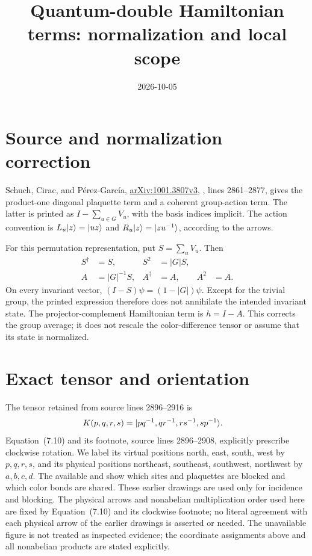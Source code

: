 \documentclass{article}
\title{Quantum-double Hamiltonian terms: normalization and local scope}
\author{}
\date{2026-10-05}
\begin{document}
\maketitle
{}

\section{Source and normalization correction}
Schuch, Cirac, and P\'erez-Garc\'ia,
\href{https://arxiv.org/abs/1001.3807}{arXiv:1001.3807v3},
, lines 2861--2877, gives the
product-one diagonal plaquette term and a coherent group-action term.
The latter is printed as $I-\sum_{u\in G}V_u$, with the basis indices
implicit. The action convention is $L_u|z\rangle=|uz\rangle$ and
$R_u|z\rangle=|zu^{-1}\rangle$, according to the arrows.

For this permutation representation, put $S=\sum_uV_u$. Then
\begin{align}
    S^\dagger & =S,         & S^2       & =|G|S,             \\
    A         & =|G|^{-1}S, & A^\dagger & =A,    & A^2 & =A.
\end{align}
On every invariant vector, $(I-S)\psi=(1-|G|)\psi$. Except for the
trivial group, the printed expression therefore does not annihilate
the intended invariant state. The projector-complement Hamiltonian term
is $h=I-A$. This corrects the group average; it does not rescale the
color-difference tensor or assume that its state is normalized.

\section{Exact tensor and orientation}
The tensor retained from source lines 2896--2916 is
\begin{align}
    K(p,q,r,s) & =|pq^{-1},qr^{-1},rs^{-1},sp^{-1}\rangle.
\end{align}
Equation~(7.10) and its footnote, source lines 2896--2908, explicitly
prescribe clockwise rotation. We label its
virtual positions north, east, south, west by $p,q,r,s$, and its physical
positions northeast, southeast, southwest, northwest by $a,b,c,d$.
The available  and
 show which sites and plaquettes are
blocked and which color bonds are shared. These earlier drawings are used
only for incidence and blocking. The physical arrows and nonabelian
multiplication order used here are fixed by Equation~(7.10) and its
clockwise footnote; no literal agreement with each physical arrow of the
earlier drawings is asserted or needed. The unavailable
 figure is not treated as inspected
evidence; the coordinate assignments above and all nonabelian products
are stated explicitly.
\end{document}
